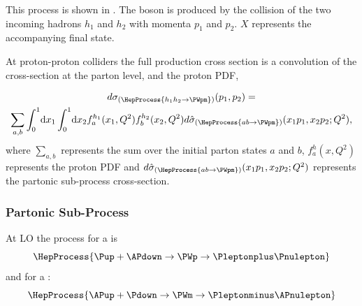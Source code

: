 This process is shown in . 
The \PW boson is produced by the collision of the two incoming hadrons $h_1$
and $h_2$ with momenta $p_1$ and $p_2$. 
$X$ represents the accompanying final state.

At proton-proton colliders the full \PW production cross section is a
convolution of the cross-section at the parton level, and the proton \ac{PDF},

\begin{multline}
  d\sigma_{(\HepProcess{h_1 h_2 \to \PWpm})}(p_1,p_2) = \\
  \sum\limits_{a,b}
  \int_0^1 \! \mathrm{d} x_1 
  \int_0^1 \! \mathrm{d} x_2 
  f_a^{h_1}(x_1,Q^2)
  f_b^{h_2}(x_2,Q^2) 
  d\hat{\sigma}_{(\HepProcess{a b \to \PWpm})}(x_1 p_1, x_2 p_2; Q^2),
  \label{wbos:xsec}
\end{multline}
where $\sum\limits_{a,b}$ represents the sum over the initial parton states $a$
and $b$, $f_a^{h}(x,Q^2)$ represents the proton \ac{PDF} and
$d\hat{\sigma}_{(\HepProcess{a b \to \PWpm})}(x_1 p_1, x_2 p_2; Q^2)$
represents the partonic sub-process cross-section.

\subsubsection*{Partonic Sub-Process}

At \ac{LO} the process for a \PWp is
\begin{equation}
  \HepProcess{\Pup + \APdown \to \PWp \to \Pleptonplus \Pnulepton} 
  \label{wbos:wpprod} 
\end{equation}
and for a \PWm:
\begin{equation}
  \HepProcess{\APup + \Pdown \to \PWm \to \Pleptonminus \APnulepton}
  \label{wbos:wmprod} 
\end{equation}

